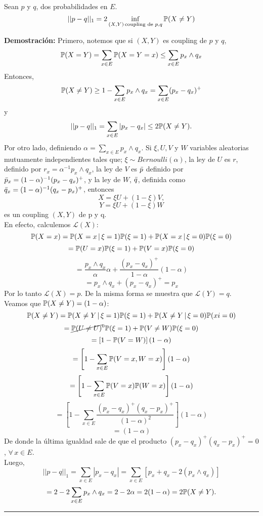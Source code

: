 \begin{lem}
Sean $p$ y $q$, dos probabilidades en $E$. 
\[||p-q||_1 = 2 \inf_{(X,Y)\,\text{coupling de }p,q}\mathbb{P}(X\neq Y)\]
\end{lem}

\textbf{Demostración: }Primero, notemos que  si $(X,Y)$ es coupling de $p$ y $q$,
\[\mathbb{P}(X=Y)=\sum_{x\in E}\mathbb{P}(X=Y=x) \leq \sum_{x\in E}p_x\wedge q_x\]
Entonces,
\[\mathbb{P}(X\neq Y)\geq 1- \sum_{x \in E}p_x\wedge q_x = \sum_{x\in E}(p_x-q_x)^{+}\]
y
\[||p-q||_1 = \sum_{x\in E}|p_x-q_x| \leq 2\mathbb{P}(X\neq Y).\]
Por otro lado, definiendo $\alpha = \sum_{x \in E}p_x\wedge q_x$. Si $\xi, U,V$ y $W$ variables aleatorias mutuamente independientes tales que; $\xi \sim Bernoulli(\alpha)$, la ley de $U$ es $r$, definido por $r_x=\alpha^{-1}p_x\wedge q_x$, la ley de $V$ es $\Bar{p}$ definido por $\Bar{p}_x = (1-\alpha)^{-1}(p_x-q_x)^{+}$, y la ley de $W$, $\Bar{q}$, definida como $\Bar{q}_x = (1-\alpha)^{-1}(q_x-p_x)^{+}$, entonces 
\[X= \xi U + (1-\xi)V,\]
\[Y =\xi U +(1-\xi)W\]
es un coupling $(X,Y)$ de p y q.\\ En efecto, calculemos $\mathcal{L}(X)$:
\[\mathbb{P}(X=x) = \mathbb{P}(X=x\,|\,\xi=1)\mathbb{P}(\xi = 1) + \mathbb{P}(X=x\,|\,\xi=0)\mathbb{P}(\xi=0)\]
\[= \mathbb{P}(U=x)\mathbb{P}(\xi = 1) + \mathbb{P}(V=x)\mathbb{P}(\xi=0)\]
\[= \frac{p_x\wedge q_x}{\alpha}\alpha + \frac{(p_x - q_x)^{+}}{1-\alpha}(1-\alpha)\]
\[= p_x\wedge q_x + (p_x -q_x)^{+} = p_x\]
Por lo tanto $\mathcal{L}(X) = p$. De la misma forma se muestra que $\mathcal{L}(Y) = q$.\\ \newline
Veamos que $\mathbb{P}(X\neq Y) = (1-\alpha)$:
\[\mathbb{P}(X\neq Y) = \mathbb{P}(X\neq Y\,|\,\xi=1)\mathbb{P}(\xi=1) + \mathbb{P}(X\neq Y\,|\,\xi=0)\mathbb{P}(xi=0)\]
\[= \cancel{\mathbb{P}(U\neq U)}^{0}\mathbb{P}(\xi=1) + \mathbb{P}(V\neq W)\mathbb{P}(\xi =0)\]
\[= \left[ 1-\mathbb{P}(V=W)\right](1-\alpha)\]
\[= \left[1 - \sum_{x \in E}\mathbb{P}(V=x,W=x)\right](1-\alpha)\]
\[= \left[1 - \sum_{x \in E}\mathbb{P}(V=x)\mathbb{P}(W=x)\right](1-\alpha)\]
\[=\left[ 1- \sum_{x\in E}\frac{(p_x -q_x)^{+}(q_x-p_x)^{+}}{(1-\alpha)^{2}}\right](1-\alpha)\]
\[=(1-\alpha)\]
De donde la última igualdad sale de que el producto $(p_x-q_x)^{+}(q_x-p_x)^{+} = 0$, $\forall\,x\in E$.\\ \newline
Luego, 
\[||p-q||_1 = \sum_{x\in E}|p_x-q_x| = \sum_{x\in E}[p_x+q_x-2(p_x\wedge q_x)]\]
\[= 2 - 2\sum_{x\in E}p_x\wedge q_x = 2-2\alpha = 2(1-\alpha) = 2\mathbb{P}(X\neq Y).\]
\rule{0.7em}{0.7em}\\ \newline

